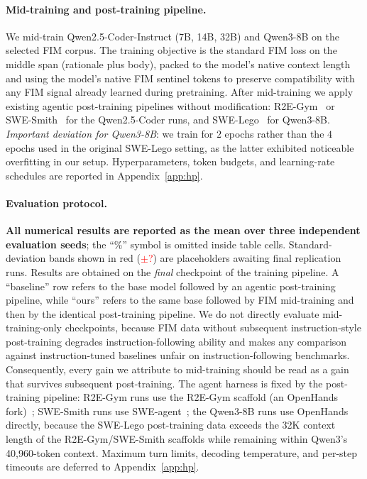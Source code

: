 \paragraph{Mid-training and post-training pipeline.}
We mid-train Qwen2.5-Coder-Instruct (7B, 14B, 32B) and Qwen3-8B on the
selected FIM corpus. The training objective is the standard FIM loss on
the middle span (rationale plus body), packed to the model's native
context length and using the model's native FIM sentinel tokens to
preserve compatibility with any FIM signal already learned during
pretraining. After mid-training we apply existing agentic post-training
pipelines without modification: R2E-Gym~\citep{r2egym} or
SWE-Smith~\citep{swesmith} for the Qwen2.5-Coder runs, and
SWE-Lego~\citep{swelego} for Qwen3-8B. \emph{Important deviation for
Qwen3-8B}: we train for $2$ epochs rather than the $4$ epochs used in the
original SWE-Lego setting, as the latter exhibited noticeable overfitting
in our setup. Hyperparameters, token budgets, and learning-rate schedules
are reported in Appendix~\ref{app:hp}.

\paragraph{Evaluation protocol.}
\textbf{All numerical results are reported as the mean over three
independent evaluation seeds}; the ``\%'' symbol is omitted inside table
cells. Standard-deviation bands shown in red (\textcolor{red}{$\pm$?}) are
placeholders awaiting final replication runs. Results are obtained on the
\emph{final} checkpoint of the training pipeline. A ``baseline'' row
refers to the base model followed by an agentic post-training pipeline,
while ``ours'' refers to the same base followed by FIM mid-training and
then by the identical post-training pipeline. We do not directly evaluate
mid-training-only checkpoints, because FIM data without subsequent
instruction-style post-training degrades instruction-following ability and
makes any comparison against instruction-tuned baselines unfair on
instruction-following benchmarks. Consequently, every gain we attribute
to mid-training should be read as a gain that survives subsequent
post-training. The agent harness is fixed by the post-training pipeline:
R2E-Gym runs use the R2E-Gym scaffold (an OpenHands
fork)~\citep{openhands, r2egym}; SWE-Smith runs use
SWE-agent~\citep{sweagent}; the Qwen3-8B runs use OpenHands directly,
because the SWE-Lego post-training data exceeds the 32K context length of
the R2E-Gym/SWE-Smith scaffolds while remaining within Qwen3's
40{,}960-token context. Maximum turn limits, decoding temperature, and
per-step timeouts are deferred to Appendix~\ref{app:hp}.

